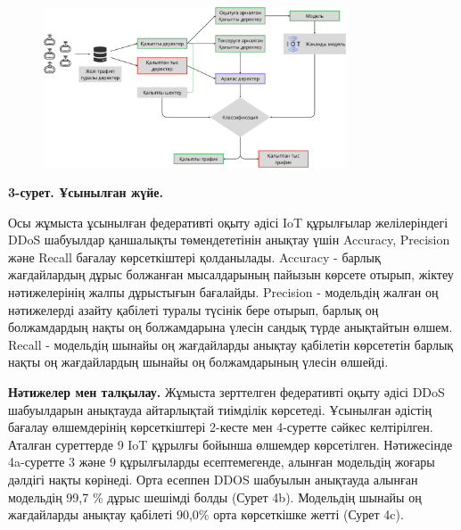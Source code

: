 \begin{figure}[H]
	\centering
	\includegraphics[width=0.8\textwidth]{assets/201}
	\caption*{}
\end{figure}

{\bfseries 3-сурет. Ұсынылған жүйе.}

Осы жұмыста ұсынылған федеративті оқыту әдісі IoT құрылғылар
желілеріндегі DDoS шабуылдар қаншалықты төмендететінін анықтау үшін
Accuracy, Precision және Recall бағалау көрсеткіштері қолданылады.
Accuracy - барлық жағдайлардың дұрыс болжанған мысалдарының пайызын
көрсете отырып, жіктеу нәтижелерінің жалпы дұрыстығын бағалайды.
Precision - модельдің жалған оң нәтижелерді азайту қабілеті туралы
түсінік бере отырып, барлық оң болжамдардың нақты оң болжамдарына үлесін
сандық түрде анықтайтын өлшем. Recall - модельдің шынайы оң жағдайларды
анықтау қабілетін көрсететін барлық нақты оң жағдайлардың шынайы оң
болжамдарының үлесін өлшейді.

{\bfseries Нәтижелер мен талқылау.} Жұмыста зерттелген федеративті оқыту
әдісі DDoS шабуылдарын анықтауда айтарлықтай тиімділік көрсетеді.
Ұсынылған әдістің бағалау өлшемдерінің көрсеткіштері 2-кесте мен
4-суретте сәйкес келтірілген. Аталған суреттерде 9 IoT құрылғы бойынша
өлшемдер көрсетілген. Нәтижесінде 4a-суретте 3 және 9 құрылғыларды
есептемегенде, алынған модельдің жоғары дәлдігі нақты көрінеді. Орта
есеппен DDOS шабуылын анықтауда алынған модельдің 99,7 \% дұрыс шешімді
болды (Сурет 4b). Модельдің шынайы оң жағдайларды анықтау қабілеті
90,0\% орта көрсеткішке жетті (Сурет 4c).


